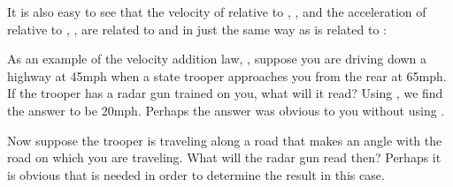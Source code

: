 {
It is also easy to see that the velocity of  relative to ,
, and the acceleration of  relative to , ,
are related to  and  in just the
same way as  is related to :
%
%

As an example of the velocity addition law, , suppose
you are driving down a highway at 45\unit{mph} when a state trooper approaches you
from the rear at 65\unit{mph}.
If the trooper has a radar gun trained on you, what will it read?
Using , we find the answer to be 20\unit{mph}. 
Perhaps the answer was obvious to you without using .

Now suppose the trooper is traveling along a road that makes an angle with
the road on which you are traveling.
What will the radar gun read then?
Perhaps it is obvious that  is needed in order to
determine the result in this case. 
}%
%
